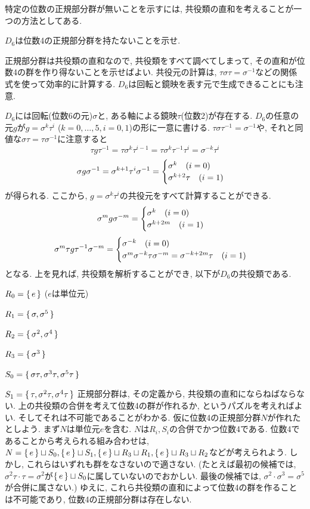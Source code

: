 特定の位数の正規部分群が無いことを示すには, 共役類の直和を考えることが一つの方法としてある.

\begin{egprob}
$D_6$は位数4の正規部分群を持たないことを示せ.
\end{egprob}
\begin{point}
正規部分群は共役類の直和なので, 共役類をすべて調べてしまって, その直和が位数4の群を作り得ないことを示せばよい. 共役元の計算は, $\tau\sigma\tau = \sigma^{-1}$などの関係式を使って効率的に計算する. $D_6$は回転と鏡映を表す元で生成できることにも注意.
\end{point}
\begin{egans}
$D_6$には回転(位数6の元)$\sigma$と, ある軸による鏡映$\tau$(位数2)が存在する. $D_6$の任意の元$g$が$g= \sigma^k \tau^i$ ($k=0,\dots, 5, i=0,1$)の形に一意に書ける. $\tau \sigma \tau^{-1} = \sigma^{-1}$や, それと同値な$\sigma\tau = \tau\sigma^{-1}$に注意すると
\[\tau g\tau^{-1} = \tau\sigma^k \tau^{i-1} = \tau\sigma^k\tau^{-1}\tau^i = \sigma^{-k}\tau^{i}\]
\[\sigma g\sigma^{-1} = \sigma^{k+1}\tau^{i}\sigma^{-1} = \begin{cases}
\sigma^{k} \quad (i=0) \\
\sigma^{k+2}\tau\quad (i=1)
\end{cases}\]
が得られる. ここから, $g=\sigma^k\tau^i$の共役元をすべて計算することができる.
\[\sigma^m g\sigma^{-m} = \begin{cases}
\sigma^k \quad (i=0) \\
\sigma^{k+2m} \quad (i=1)
\end{cases} \]
\[\sigma^m \tau g \tau^{-1} \sigma^{-m} =
\begin{cases}
\sigma^{-k} \quad (i=0)\\
\sigma^m \sigma^{-k}\tau \sigma^{-m} = \sigma^{-k+2m}\tau\quad (i=1)
\end{cases}
\]
となる. 上を見れば, 共役類を解析することができ, 以下が$D_6$の共役類である.
\ben[label=$\bullet$]
\item $R_0=\set{e}$ ($e$は単位元)
\item $R_1=\set{\sigma, \sigma^5}$
\item $R_2=\set{\sigma^2, \sigma^{4}}$
\item $R_3=\set{\sigma^3}$
\item $S_0=\set{\sigma\tau,\sigma^3\tau, \sigma^5\tau}$
\item $S_1=\set{\tau,\sigma^2\tau, \sigma^4\tau}$
\een
正規部分群は, その定義から, 共役類の直和にならねばならない. 上の共役類の合併を考えて位数4の群が作れるか, というパズルを考えればよい. そしてそれは不可能であることがわかる. 仮に位数4の正規部分群$N$が作れたとしよう. まず$N$は単位元$e$を含む. $N$は$R_i,S_i$の合併でかつ位数4である. 位数4であることから考えられる組み合わせは, $N=\set{e}\sqcup S_0, \set{e}\sqcup S_1, \set{e}\sqcup R_3\sqcup R_1, \set{e}\sqcup R_3\sqcup R_2$などが考えられよう. しかし, これらはいずれも群をなさないので適さない. (たとえば最初の候補では, $\sigma^2\tau \cdot \tau = \sigma^2$が$\set{e}\sqcup S_0$に属していないのでおかしい. 最後の候補では, $\sigma^2\cdot \sigma^3 = \sigma^5$が合併に属さない.) ゆえに, これら共役類の直和によって位数4の群を作ることは不可能であり, 位数4の正規部分群は存在しない.

\end{egans}



